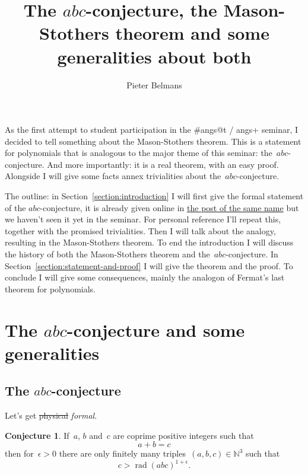 \documentclass[11pt, a4paper, openany, oneside, article]{memoir}
\theoremstyle{definition}
\newtheorem{conjecture}[theorem]{Conjecture}
\DeclareMathOperator\rad{rad}
\begin{document}
\title{The $abc$-conjecture, the Mason-Stothers theorem and some generalities about both}
\author{Pieter Belmans}
\maketitle

\listoftodos

\tableofcontents*

As the first attempt to student participation in the \#angs@t / angs+ seminar, I decided to tell something about the Mason-Stothers theorem. This is a statement for polynomials that is analogous to the major theme of this seminar: the~$abc$\nobreakdash-conjecture. And more importantly: it is a real theorem, with an easy proof. Alongside I will give some facts annex trivialities about the~$abc$\nobreakdash-conjecture.

The outline: in Section~\ref{section:introduction} I will first give the formal statement of the $abc$-conjecture, it is already given online in \href{http://www.noncommutative.org/index.php/the-abc-conjecture.html}{the post of the same name} but we haven't seen it yet in the seminar. For personal reference I'll repeat this, together with the promised trivialities. Then I will talk about the analogy, resulting in the Mason-Stothers theorem. To end the introduction I will discuss the history of both the Mason-Stothers theorem and the~$abc$\nobreakdash-conjecture. In Section~\ref{section:statement-and-proof} I will give the theorem and the proof. To conclude I will give some consequences, mainly the analogon of Fermat's last theorem for polynomials.

\clearpage


\section{The $abc$-conjecture and some generalities}
\label{section:abc}

\subsection{The $abc$-conjecture}

Let's get \sout{physical} \emph{formal}.

\begin{conjecture}
  \label{conjecture:abc}
  If~$a$, $b$ and~$c$ are coprime positive integers such that
  \begin{equation}
    \label{equation:abc-equality}
    a+b=c
  \end{equation}
  then for~$\epsilon>0$ there are only finitely many triples~$(a,b,c)\in\mathbb{N}^3$ such that
  \begin{equation}
    \label{equation:abc-inequality}
    c>\rad(abc)^{1+\epsilon}.
  \end{equation}
\end{conjecture}
\end{document}
